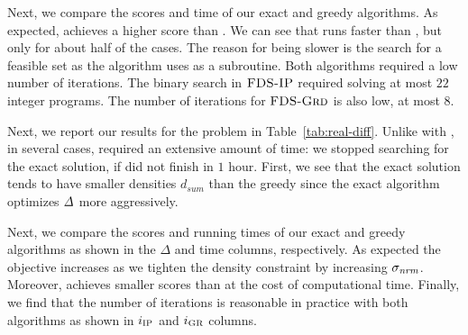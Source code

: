Next, we compare the scores and time of our exact and greedy algorithms. As expected, \algipcm achieves a higher score than \alggrdfms. 
We can see that \alggrdfms runs faster than \algipcm, but only for about half of the cases.
The reason for \alggrdfms being slower is the search for a feasible set as the algorithm uses \alggrd as a subroutine. Both algorithms required a low number of iterations.
The binary search in $\textsc{FDS-IP}$ required solving at most $22$ integer programs. 
The number of iterations for $\textsc{FDS-Grd}$ is also low, at most $8$.

Next, we report our results for the \problemcdcsdiff problem in Table~\ref{tab:real-diff}.
Unlike with \algipcm,
in several cases, \algipdiff required an extensive amount of time: we stopped searching for the exact solution, if 
\algipdiff did not finish in $1$ hour. 
First, we see that the exact solution tends to have smaller densities $d_{\mathit{sum}}$ than the greedy since the exact algorithm optimizes $\diff{}$ more aggressively.

Next, we compare the scores and running times of our exact and greedy algorithms as shown in the $\Delta$ and time columns, respectively. As expected the objective increases as we tighten the density constraint by increasing $\sigma_{\mathit{nrm}}$.
Moreover, \algipdiff achieves smaller scores than \alggrd at the cost of computational time. 
Finally, we find that the number of iterations is reasonable in practice with both algorithms as shown in $i_{\textsc{IP}}$ and $i_{\textsc{GR}}$ columns.

